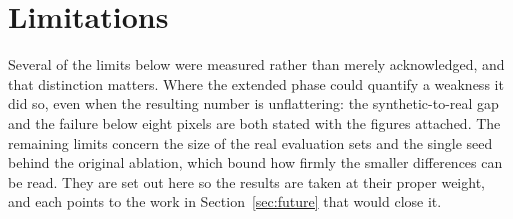 \documentclass[12pt,a4paper,oneside]{report}
\begin{document}
\section{Limitations}

Several of the limits below were measured rather than merely acknowledged, and
that distinction matters. Where the extended phase could quantify a weakness it
did so, even when the resulting number is unflattering: the synthetic-to-real
gap and the failure below eight pixels are both stated with the figures attached.
The remaining limits concern the size of the real evaluation sets and the single
seed behind the original ablation, which bound how firmly the smaller
differences can be read. They are set out here so the results are taken at their
proper weight, and each points to the work in Section~\ref{sec:future} that would
close it.
\end{document}
